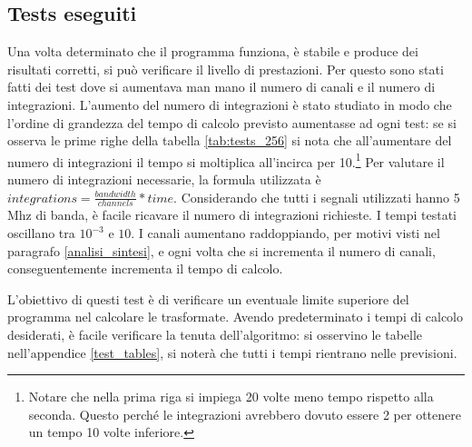 \subsection{Tests eseguiti}

Una volta determinato che il programma funziona, \`e stabile e produce dei
risultati corretti, si pu\`o verificare il livello di prestazioni. Per questo
sono stati fatti dei test dove si aumentava man mano il numero di canali e il
numero di integrazioni. L'aumento del numero di integrazioni \`e stato studiato
in modo che l'ordine di grandezza del tempo di calcolo previsto aumentasse ad
ogni test: se si osserva le prime righe della tabella \ref{tab:tests_256} si nota
che all'aumentare del numero di integrazioni il tempo si moltiplica all'incirca
per 10.\footnote{Notare che nella prima riga si impiega 20 volte meno tempo
    rispetto alla seconda. Questo perch\'e le integrazioni avrebbero dovuto
    essere 2 per ottenere un tempo 10 volte inferiore.}
Per valutare il numero di integrazioni necessarie, la formula utilizzata \`e
$integrations = \frac{bandwidth}{channels} * time$. Considerando che tutti i
segnali utilizzati hanno 5 Mhz di banda, \`e facile ricavare il numero di
integrazioni richieste. I tempi testati oscillano tra $10^{-3}$ e $10$.
I canali aumentano raddoppiando, per motivi visti nel paragrafo
\ref{analisi_sintesi}, e ogni volta che si incrementa il numero di canali,
conseguentemente incrementa il tempo di calcolo.

L'obiettivo di questi test \`e di verificare un eventuale limite superiore del
programma nel calcolare le trasformate. Avendo predeterminato i tempi di calcolo
desiderati, \`e facile verificare la tenuta dell'algoritmo: si osservino le
tabelle nell'appendice \ref{test_tables}, si noter\`a che tutti i tempi
rientrano nelle previsioni.

